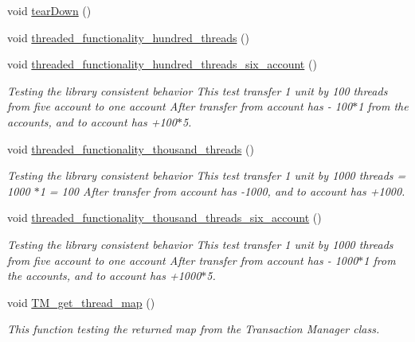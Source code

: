 \begin{DoxyCompactItemize}
void \hyperlink{class_my_test_c_ase_aeb24ab2614834b9c3b02fd15d288ea0c_aeb24ab2614834b9c3b02fd15d288ea0c}{tear\+Down} ()
\item 
void \hyperlink{class_my_test_c_ase_afdb39bda80c1305ac1c4cc0e5ce022f4_afdb39bda80c1305ac1c4cc0e5ce022f4}{threaded\+\_\+functionality\+\_\+hundred\+\_\+threads} ()
\item 
void \hyperlink{class_my_test_c_ase_acdc0278b6fa7c0102b9e5cdfb68a41a1_acdc0278b6fa7c0102b9e5cdfb68a41a1}{threaded\+\_\+functionality\+\_\+hundred\+\_\+threads\+\_\+six\+\_\+account} ()
\begin{DoxyCompactList}\small\item\em Testing the library consistent behavior This test transfer 1 unit by 100 threads from five account to one account After transfer from account has -\/ 100$\ast$1 from the accounts, and to account has +100$\ast$5. \end{DoxyCompactList}\item 
void \hyperlink{class_my_test_c_ase_a03f867cf5e2295e4055fe88d825b1710_a03f867cf5e2295e4055fe88d825b1710}{threaded\+\_\+functionality\+\_\+thousand\+\_\+threads} ()
\begin{DoxyCompactList}\small\item\em Testing the library consistent behavior This test transfer 1 unit by 1000 threads = 1000 $\ast$1 = 100 After transfer from account has -\/1000, and to account has +1000. \end{DoxyCompactList}\item 
void \hyperlink{class_my_test_c_ase_ab7d15a71958588c6402f234e106668b1_ab7d15a71958588c6402f234e106668b1}{threaded\+\_\+functionality\+\_\+thousand\+\_\+threads\+\_\+six\+\_\+account} ()
\begin{DoxyCompactList}\small\item\em Testing the library consistent behavior This test transfer 1 unit by 1000 threads from five account to one account After transfer from account has -\/ 1000$\ast$1 from the accounts, and to account has +1000$\ast$5. \end{DoxyCompactList}\item 
void \hyperlink{class_my_test_c_ase_abbb762450dffd3be8bf9d1b6ec757466_abbb762450dffd3be8bf9d1b6ec757466}{T\+M\+\_\+get\+\_\+thread\+\_\+map} ()
\begin{DoxyCompactList}\small\item\em This function testing the returned map from the Transaction Manager class. \end{DoxyCompactList}\item 

\end{DoxyCompactItemize}
